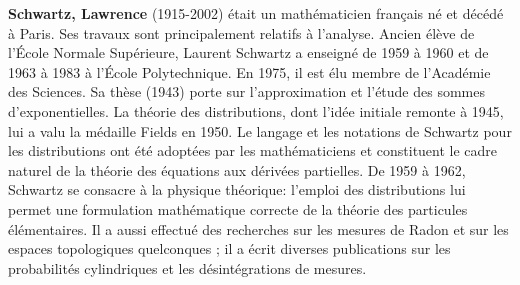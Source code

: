 \textbf{Schwartz, Lawrence} (1915-2002) était un mathématicien français né et décédé à Paris. Ses travaux sont principalement relatifs à l'analyse. Ancien élève de l'École Normale Supérieure, Laurent Schwartz a enseigné de 1959 à 1960 et de 1963 à 1983 à l'École Polytechnique. En 1975, il est élu membre de l'Académie des Sciences. Sa thèse (1943) porte sur l'approximation et l'étude des sommes d'exponentielles. La théorie des distributions, dont l'idée initiale remonte à 1945, lui a valu la médaille Fields en 1950. Le langage et les notations de Schwartz pour les distributions ont été adoptées par les mathématiciens et constituent le cadre naturel de la théorie des équations aux dérivées partielles. De 1959 à 1962, Schwartz se consacre à la physique théorique: l'emploi des distributions lui permet une formulation mathématique correcte de la théorie des particules élémentaires. Il a aussi effectué des recherches sur les mesures de Radon et sur les espaces topologiques quelconques ; il a écrit diverses publications sur les probabilités cylindriques et les désintégrations de mesures.

